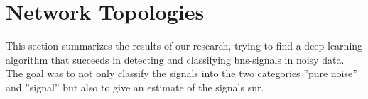 \section{Network Topologies}\label{sec:network_topologies}
This section summarizes the results of our research, trying to find a deep learning algorithm that succeeds in detecting and classifying \gls{bns}-signals in noisy data. The goal was to not only classify the signals into the two categories ''pure noise'' and ''signal'' but also to give an estimate of the signals \gls{snr}.\\

